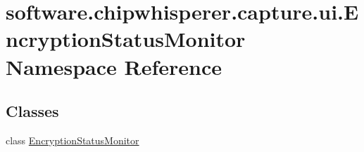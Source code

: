 \hypertarget{namespacesoftware_1_1chipwhisperer_1_1capture_1_1ui_1_1EncryptionStatusMonitor}{}\section{software.\+chipwhisperer.\+capture.\+ui.\+Encryption\+Status\+Monitor Namespace Reference}
\label{namespacesoftware_1_1chipwhisperer_1_1capture_1_1ui_1_1EncryptionStatusMonitor}
\subsection*{Classes}
\begin{DoxyCompactItemize}
\item 
class \hyperlink{classsoftware_1_1chipwhisperer_1_1capture_1_1ui_1_1EncryptionStatusMonitor_1_1EncryptionStatusMonitor}{Encryption\+Status\+Monitor}
\end{DoxyCompactItemize}

